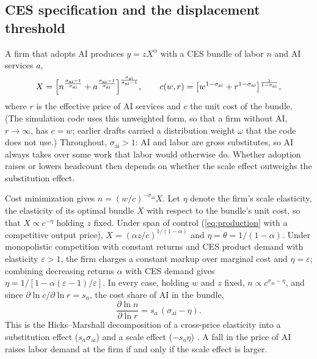 \subsection{CES specification and the displacement threshold}\label{sec:ai-ces}

A firm that adopts AI produces $y = z X^{\alpha}$ with a CES bundle of labor $n$ and AI services $a$,
\begin{equation}\label{eq:ces-bundle}
  X = \Bigl[ n^{\frac{\sigma_{\text{ai}}-1}{\sigma_{\text{ai}}}} + a^{\frac{\sigma_{\text{ai}}-1}{\sigma_{\text{ai}}}} \Bigr]^{\frac{\sigma_{\text{ai}}}{\sigma_{\text{ai}}-1}}, \qquad
  c(w, r) = \bigl[ w^{1-\sigma_{\text{ai}}} + r^{1-\sigma_{\text{ai}}} \bigr]^{\frac{1}{1-\sigma_{\text{ai}}}},
\end{equation}
where $r$ is the effective price of AI services and $c$ the unit cost of the bundle.
(The simulation code uses this unweighted form, so that a firm without AI, $r \to \infty$, has $c = w$; earlier drafts carried a distribution weight $\omega$ that the code does not use.)
Throughout, $\sigma_{\text{ai}} > 1$: AI and labor are gross substitutes, so AI always takes over some work that labor would otherwise do.
Whether adoption raises or lowers headcount then depends on whether the scale effect outweighs the substitution effect.

Cost minimization gives $n = (w/c)^{-\sigma_{\text{ai}}} X$.
Let $\eta$ denote the firm's scale elasticity, the elasticity of its optimal bundle $X$ with respect to the bundle's unit cost, so that $X \propto c^{-\eta}$ holding $z$ fixed.
Under span of control (\cref{eq:production} with a competitive output price), $X = (\alpha z / c)^{1/(1-\alpha)}$ and $\eta = \theta = 1/(1-\alpha)$.
Under monopolistic competition with constant returns and CES product demand with elasticity $\varepsilon > 1$, the firm charges a constant markup over marginal cost and $\eta = \varepsilon$; combining decreasing returns $\alpha$ with CES demand gives $\eta = 1/[1 - \alpha(\varepsilon-1)/\varepsilon]$.
In every case, holding $w$ and $z$ fixed, $n \propto c^{\sigma_{\text{ai}} - \eta}$, and since $\partial \ln c / \partial \ln r = s_a$, the cost share of AI in the bundle,
\begin{equation}\label{eq:ces-elasticity}
  \frac{\partial \ln n}{\partial \ln r} = s_a \, (\sigma_{\text{ai}} - \eta) .
\end{equation}
This is the Hicks--Marshall decomposition of a cross-price elasticity into a substitution effect ($s_a \sigma_{\text{ai}}$) and a scale effect ($-s_a \eta$) \citep{hamermesh1993labor}.
A fall in the price of AI raises labor demand at the firm if and only if the scale effect is larger.

